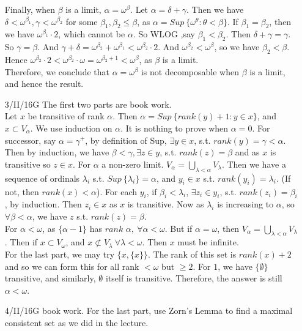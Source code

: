 \begin{enumerate}
    Finally, when $\beta$ is a limit, $\alpha=\omega^\beta$. Let $\alpha=\delta+\gamma$. Then we have $\delta<\omega^{\beta_1}, \gamma <\omega^{\beta_2}$ for some $\beta_1,\beta_2 \le \beta$, as $\alpha = Sup~\{\omega^\theta: \theta < \beta\}$. If $\beta_1 =\beta_2$, then we have $\omega^{\beta_1} \cdot 2$, which cannot be $\alpha$. So WLOG ,say $\beta_1 < \beta_2$. Then $\delta+\gamma =\gamma$. So $\gamma =\beta$. And $\gamma+\delta = \omega^{\beta_2} + \omega^{\beta_1} < \omega^{\beta_2} \cdot 2$. And $\omega^{\beta_2}<\omega^\beta$, so we have $\beta_2 < \beta$. Hence $\omega^{\beta_2} \cdot 2 < \omega^{\beta_2} \cdot \omega=\omega^{\beta_2 +1} <\omega^\beta$, as $\beta$ is a limit.\\
    Therefore, we conclude that $\alpha=\omega^\beta$ is not decomposable when $\beta$ is a limit, and hence the result.\\
\item[3/II/16G] The first two parts are book work.\\
     Let $x$ be transitive of rank $\alpha$. Then $\alpha = Sup~\{rank(y)+1: y \in x\}$, and $x \subset V_\alpha$. We use induction on $\alpha$. It is nothing to prove when $\alpha=0$.
     For successor, say $\alpha=\gamma^+$, by definition of Sup, $\exists y \in x$, s.t. $rank(y)=\gamma <\alpha$. Then by induction, we have $\beta < \gamma, \exists z \in y$, s.t. $rank(z)=\beta$ and as $x$ is transitive so $z \in x$. For $\alpha$ a non-zero limit. $V_\alpha=\bigcup_{\lambda < \alpha}V_\lambda$. Then we have a sequence of ordinals $\lambda_i$ s.t. $Sup~\{\lambda_i\}=\alpha$, and $y_i \in x$ s.t. $rank(y_i)=\lambda_i$. (If not, then $rank(x)<\alpha$). For each $y_i$, if $\beta_i < \lambda_i$, $\exists z_i \in y_i$, s.t. $rank(z_i) = \beta_i$, by induction. Then $z_i \in x$ as $x$ is transitive. Now as $\lambda_i$ is increasing to $\alpha$, so $\forall \beta<\alpha$, we have $z$ s.t. $rank(z)=\beta$.\\
     For $\alpha< \omega$, as $\{\alpha -1\}$ has $rank$ $\alpha, ~\forall \alpha < \omega$. But if $\alpha =\omega$, then $V_\alpha=\bigcup_{\lambda < \alpha}V_\lambda$. Then if $x \subset V_\omega$, and $x \not \subset V_\lambda ~\forall \lambda < \omega$. Then $x$ must be infinite.\\
     For the last part, we may try $\{x,\{x\}\}$. The rank of this set is $rank(x)+2$ and so we can form this for all rank $< \omega$ but $\ge 2$. For $1$, we have $\{\emptyset\}$ transitive, and similarly, $\emptyset$ itself is transitive. Therefore, the answer is still $\alpha < \omega$.\\
\item[4/II/16G] book work. For the last part, use Zorn's Lemma to find a maximal consistent set as we did in the lecture.
\end{enumerate}
